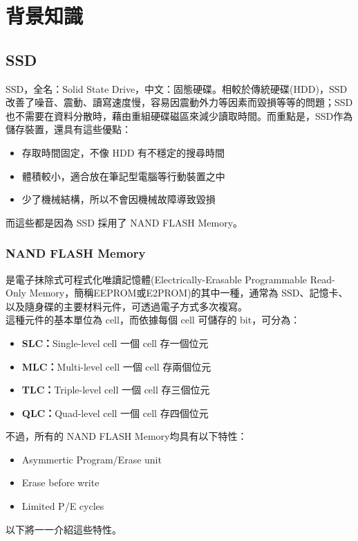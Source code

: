 \chapter{背景知識}

\section{SSD}\label{s2.1}
\indent
SSD，全名：Solid State Drive，中文：固態硬碟。相較於傳統硬碟(HDD)，SSD改善了噪音、震動、讀寫速度慢，容易因震動外力等因素而毀損等等的問題；SSD 也不需要在資料分散時，藉由重組硬碟磁區來減少讀取時間。而重點是，SSD作為儲存裝置，還具有這些優點：\cite{SSD}
\begin{itemize}
    \item 存取時間固定，不像 HDD 有不穩定的搜尋時間
    \item 體積較小，適合放在筆記型電腦等行動裝置之中
    \item 少了機械結構，所以不會因機械故障導致毀損
\end{itemize}

而這些都是因為 SSD 採用了 NAND FLASH Memory。

\subsection{NAND FLASH Memory}\label{s2.1.1}
\indent
是電子抹除式可程式化唯讀記憶體(Electrically-Erasable Programmable Read-Only Memory，簡稱EEPROM或E2PROM)的其中一種，通常為 SSD、記憶卡、以及隨身碟的主要材料元件，可透過電子方式多次複寫。\\
這種元件的基本單位為 cell，而依據每個 cell 可儲存的 bit，可分為：
\begin{itemize}
    \item \textbf{SLC：}Single-level cell   一個 cell 存一個位元
    \item \textbf{MLC：}Multi-level cell    一個 cell 存兩個位元
    \item \textbf{TLC：}Triple-level cell   一個 cell 存三個位元
    \item \textbf{QLC：}Quad-level cell     一個 cell 存四個位元
\end{itemize}
不過，所有的 NAND FLASH Memory均具有以下特性：
\begin{itemize}
    \item Asymmertic Program/Erase unit
    \item Erase before write
    \item Limited P/E cycles
\end{itemize}
以下將一一介紹這些特性。

